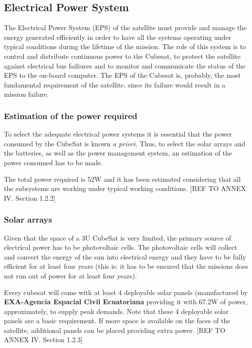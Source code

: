 \subsection{Electrical Power System}

The Electrical Power System (EPS) of the satellite must provide and manage the energy generated efficiently in order to have all the systems operating under typical conditions during the lifetime of the mission. The role of this system is to control and distribute continuous power to the Cubesat, to protect the satellite against electrical bus failiures and to monitor and communicate the status of the EPS to the on-board computer. The EPS of the Cubesat is, probably, the most fundamental requirement of the satellite, since its failure would result in a mission failure. 

\subsubsection{Estimation of the power required}
To select the adequate electrical power systems it is essential that the power consumed by the CubeSat is known \textit{a priori}. Thus, to select the solar arrays and the batteries, as well as the power management system, an estimation of the power consumed has to be made.

The total power required is 52W and it has been estimated considering that all the subsystems are working under typical working conditions. [{REF TO ANNEX IV. Section 1.2.2}]

\subsubsection{Solar arrays}
Given that the space of a 3U CubeSat is very limited, the primary source of electrical power has to be photovoltaic cells. The photovoltaic cells will collect and convert the energy of the sun into electrical energy and they have to be fully efficient for at least four years (this is: it has to be ensured that the missions does not run out of power for at least four years). 

Every cubesat will come with at least 4 deployable solar panels (manufactured by \textbf{EXA-Agencia Espacial Civil Ecuatoriana} providing it with 67.2W of power, approximately, to supply peak demands. Note that these 4 deployable solar panels are a basic requirement. If more space is available on the faces of the satellite, additional panels can be placed providing extra power. [{REF TO ANNEX IV. Section 1.2.3}]


